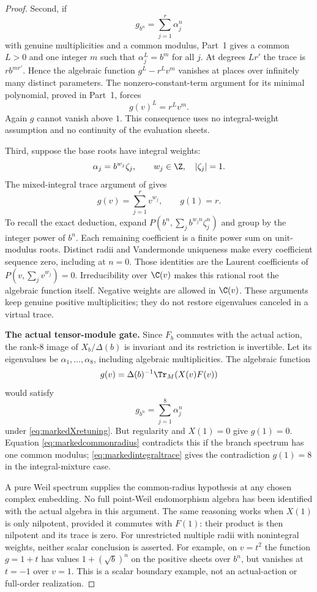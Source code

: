 \begin{proof}
Second, if
\[
 g_{b^n}=\sum_{j=1}^r\alpha_j^n
\]
with genuine multiplicities and a common modulus,
Part~1 gives a common $L>0$ and one integer $m$ such that
$\alpha_j^L=b^m$ for all $j$.
At degrees $Lr'$ the trace is $r b^{mr'}$.
Hence the algebraic function $g^L-r^L v^m$ vanishes
at places over infinitely many distinct parameters.
The nonzero-constant-term argument for its minimal
polynomial, proved in Part~1, forces
\begin{equation}\label{eq:markedcommonradius}
 g(v)^L=r^L v^m.
\end{equation}
Again $g$ cannot vanish above $1$.
This consequence uses no integral-weight assumption
and no continuity of the evaluation sheets.

Third, suppose the base roots have integral weights:
\[
 \alpha_j=b^{w_j}\zeta_j,\qquad
 w_j\in\Z,\quad |\zeta_j|=1.
\]
The mixed-integral trace argument of  gives
\begin{equation}\label{eq:markedintegraltrace}
 g(v)=\sum_{j=1}^r v^{w_j},\qquad g(1)=r.
\end{equation}
To recall the exact deduction, expand
$P(b^n,\sum_j b^{w_jn}\zeta_j^n)$ and group by the
integer power of $b^n$.
Each remaining coefficient is a finite power sum
on unit-modulus roots.
Distinct radii and Vandermonde uniqueness make every
coefficient sequence zero, including at $n=0$.
Those identities are the Laurent coefficients of
$P(v,\sum_jv^{w_j})=0$.
Irreducibility over $\C(v)$ makes this rational root
the algebraic function itself.
Negative weights are allowed in $\C(v)$.
These arguments keep genuine positive multiplicities;
they do not restore eigenvalues canceled in a virtual trace.

\par\smallskip\noindent\textbf{The actual tensor-module gate.}\quad
Since $F_b$ commutes with the actual action,
the rank-$8$ image of $X_b/\Delta(b)$ is invariant
and its restriction is invertible.
Let its eigenvalues be $\alpha_1,\ldots,\alpha_8$,
including algebraic multiplicities.
The algebraic function
\[
 g(v)=\Delta(b)^{-1}\Tr_M(X(v)F(v))
\]
would satisfy
\[
 g_{b^n}=\sum_{j=1}^8\alpha_j^n
\]
under \eqref{eq:markedXretuning}.
But regularity and $X(1)=0$ give $g(1)=0$.
Equation \eqref{eq:markedcommonradius} contradicts this
if the branch spectrum has one common modulus;
\eqref{eq:markedintegraltrace} gives the contradiction
$g(1)=8$ in the integral-mixture case.

A pure Weil spectrum supplies the common-radius hypothesis
at any chosen complex embedding.
No full point-Weil endomorphism algebra has been identified
with the actual algebra in this argument.
The same reasoning works when $X(1)$ is only nilpotent,
provided it commutes with $F(1)$:
their product is then nilpotent and its trace is zero.
For unrestricted multiple radii with nonintegral weights,
neither scalar conclusion is asserted.
For example, on $v=t^2$ the function $g=1+t$ has values
$1+(\sqrt b)^n$ on the positive sheets over $b^n$,
but vanishes at $t=-1$ over $v=1$.
This is a scalar boundary example, not an actual-action
or full-order realization.


\end{proof}
